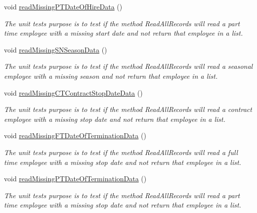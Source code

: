 \begin{DoxyCompactItemize}
void \hyperlink{class_file_i_o_tests_1_1_file_i_o_tests_ae6e7830712461fd1d303c09821c60527}{read\+Missing\+P\+T\+Date\+Of\+Hire\+Data} ()
\begin{DoxyCompactList}\small\item\em The unit test\textquotesingle{}s purpose is to test if the method Read\+All\+Records will read a part time employee with a missing start date and not return that employee in a list. \end{DoxyCompactList}\item 
void \hyperlink{class_file_i_o_tests_1_1_file_i_o_tests_a90be7ea571075a90ff102032830cd797}{read\+Missing\+S\+N\+Season\+Data} ()
\begin{DoxyCompactList}\small\item\em The unit test\textquotesingle{}s purpose is to test if the method Read\+All\+Records will read a seasonal employee with a missing season and not return that employee in a list. \end{DoxyCompactList}\item 
void \hyperlink{class_file_i_o_tests_1_1_file_i_o_tests_a0e304d2802533ca35e434bcf47e6defc}{read\+Missing\+C\+T\+Contract\+Stop\+Date\+Data} ()
\begin{DoxyCompactList}\small\item\em The unit test\textquotesingle{}s purpose is to test if the method Read\+All\+Records will read a contract employee with a missing stop date and not return that employee in a list. \end{DoxyCompactList}\item 
void \hyperlink{class_file_i_o_tests_1_1_file_i_o_tests_af43bf69b8856dd027852251783264787}{read\+Missing\+F\+T\+Date\+Of\+Termination\+Data} ()
\begin{DoxyCompactList}\small\item\em The unit test\textquotesingle{}s purpose is to test if the method Read\+All\+Records will read a full time employee with a missing stop date and not return that employee in a list. \end{DoxyCompactList}\item 
void \hyperlink{class_file_i_o_tests_1_1_file_i_o_tests_a5a6dcd3089b10fa0d79f7af555157abd}{read\+Missing\+P\+T\+Date\+Of\+Termination\+Data} ()
\begin{DoxyCompactList}\small\item\em The unit test\textquotesingle{}s purpose is to test if the method Read\+All\+Records will read a part time employee with a missing stop date and not return that employee in a list. \end{DoxyCompactList}\item 

\end{DoxyCompactItemize}
